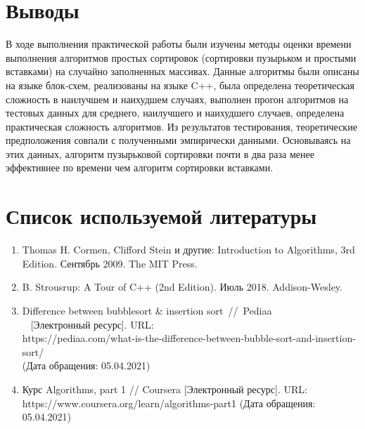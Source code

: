 \documentclass[14pt]{extarticle}
\begin{document}
\section{Выводы}
В ходе выполнения практической работы были изучены методы оценки времени
выполнения алгоритмов простых сортировок (сортировки пузырьком и
простыми вставками) на случайно заполненных массивах.
Данные алгоритмы были описаны на языке блок-схем, реализованы
на языке C++, была определена теоретическая сложность в наилучшем и
наихудшем случаях, выполнен прогон алгоритмов на тестовых данных для
среднего, наилучшего и наихудшего случаев, определена практическая
сложность алгоритмов. Из результатов тестирования, теоретические
предположения совпали с полученными эмпирически данными. Основываясь
на этих данных, алгоритм пузырьковой сортировки почти в два раза
менее эффективнее по времени чем алгоритм сортировки вставками.
\section{Список используемой литературы}
\begin{enumerate}
  \item Thomas H. Cormen, Clifford Stein и другие: Introduction to Algorithms, 3rd Edition.
    Сентябрь 2009. The MIT Press.
  \item B. Strousrup: A Tour of C++ (2nd Edition). Июль 2018. Addison-Wesley.
  \item Difference between bubblesort \& insertion sort~//~Pediaa \\~
    [Электронный ресурс]. URL:
    \\ https://pediaa.com/what-is-the-difference-between-bubble-sort-and-insertion-sort/\\
    (Дата обращения: 05.04.2021)
   \item Курс Algorithms, part 1 // Coursera [Электронный ресурс]. URL:
     \\ https://www.coursera.org/learn/algorithms-part1
     (Дата обращения: 05.04.2021)
\end{enumerate}
\end{document}
